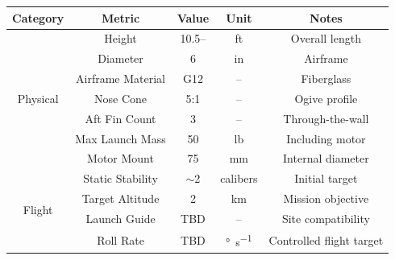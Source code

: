 \begin{table}[H]
    \centering
    \begin{tabular}{ccccc}
    \toprule
    \textbf{Category} & \textbf{Metric} & \textbf{Value} & \textbf{Unit} & \textbf{Notes} \\ 
    \midrule


    \multirow{7}{*}{Physical}
        & Height
        & 10.5--\RHeight{}
        & \unit{ft}
        & Overall length \\
    \cmidrule(lr){2-5}

        & Diameter
        & 6
        & \unit{in}
        & Airframe \\
    \cmidrule(lr){2-5}

        & Airframe Material
        & G12
        & --
        & Fiberglass \\
    \cmidrule(lr){2-5}

        & Nose Cone
        & 5:1
        & --
        & Ogive profile \\
    \cmidrule(lr){2-5}

        & Aft Fin Count
        & 3
        & --
        & Through-the-wall \\
    \cmidrule(lr){2-5}

        & Max Launch Mass
        & 50
        & \unit{lb}
        & Including motor \\
    \cmidrule(lr){2-5}

        & Motor Mount
        & 75
        & \unit{mm}
        & Internal diameter \\
    \midrule


    \multirow{4}{*}{Flight}
        & Static Stability
        & $\sim$2
        & calibers
        & Initial target \\
    \cmidrule(lr){2-5}

        & Target Altitude
        & 2
        & \unit{\kilo\meter}
        & Mission objective \\
    \cmidrule(lr){2-5}

        & Launch Guide
        & TBD
        & --
        & Site compatibility \\
    \cmidrule(lr){2-5}

        & Roll Rate
        & TBD
        & \unit{\degree\per\second}
        & Controlled flight target \\
    \midrule


\end{tabular}
\end{table}
